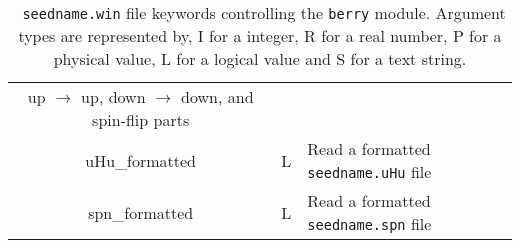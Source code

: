 \begin{table}[hH!]
\begin{center}
\begin{tabular}{|c|c|p{6cm}|}
  up $\rightarrow$ up, down $\rightarrow$ down, and spin-flip parts\\
  {\sc uHu\_formatted}& L & Read a formatted {\tt seedname.uHu} file \\
  {\sc spn\_formatted} & L & Read a formatted {\tt seedname.spn} file \\
  \hline
\end{tabular}
\caption[Parameter file keywords controlling the Berry module.]  {{\tt
    seedname.win} file keywords controlling the {\tt berry}
  module. Argument types are represented by, I for a integer, R for a
  real number, P for a physical value, L for a logical value and S for
  a text string.}
\label{parameter_keywords_berry}
\end{center}
\end{table}



